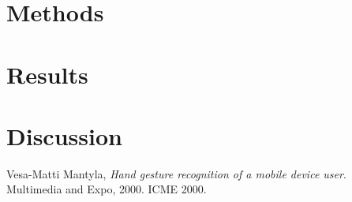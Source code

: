 \documentclass[twoside]{article}
\begin{document}
\begin{multicols}{2}
\section{Methods}


\section{Results}



\section{Discussion}



\begin{thebibliography}{2} %

Vesa-Matti Mantyla, \emph{Hand gesture recognition of a mobile device user}. Multimedia and Expo, 2000. ICME 2000. 

%
%
\end{thebibliography}


\end{multicols}
\end{document}

